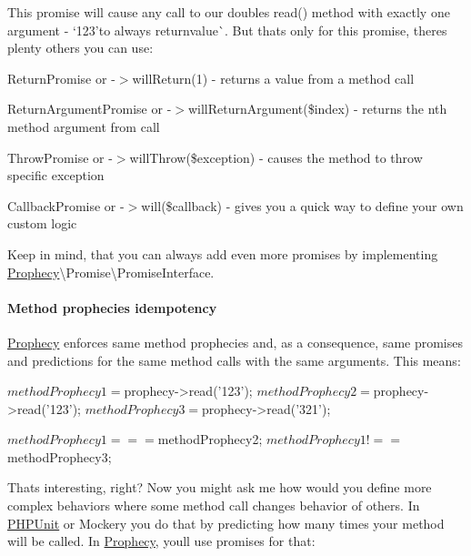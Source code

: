 This promise will cause any call to our double\textquotesingle{}s {\ttfamily read()} method with exactly one argument -\/ `\textquotesingle{}123'{\ttfamily to always return}\textquotesingle{}value\textquotesingle{}\`{}. But that\textquotesingle{}s only for this promise, there\textquotesingle{}s plenty others you can use\+:


\begin{DoxyItemize}
\item {\ttfamily Return\+Promise} or {\ttfamily -\/$>$will\+Return(1)} -\/ returns a value from a method call
\item {\ttfamily Return\+Argument\+Promise} or {\ttfamily -\/$>$will\+Return\+Argument(\$index)} -\/ returns the nth method argument from call
\item {\ttfamily Throw\+Promise} or {\ttfamily -\/$>$will\+Throw(\$exception)} -\/ causes the method to throw specific exception
\item {\ttfamily Callback\+Promise} or {\ttfamily -\/$>$will(\$callback)} -\/ gives you a quick way to define your own custom logic
\end{DoxyItemize}

Keep in mind, that you can always add even more promises by implementing {\ttfamily \mbox{\hyperlink{namespace_prophecy}{Prophecy}}\textbackslash{}Promise\textbackslash{}Promise\+Interface}.

\paragraph*{Method prophecies idempotency}

\mbox{\hyperlink{namespace_prophecy}{Prophecy}} enforces same method prophecies and, as a consequence, same promises and predictions for the same method calls with the same arguments. This means\+:


\begin{DoxyCode}
$methodProphecy1 = $prophecy->read(\textcolor{stringliteral}{'123'});
$methodProphecy2 = $prophecy->read(\textcolor{stringliteral}{'123'});
$methodProphecy3 = $prophecy->read(\textcolor{stringliteral}{'321'});

$methodProphecy1 === $methodProphecy2;
$methodProphecy1 !== $methodProphecy3;
\end{DoxyCode}


That\textquotesingle{}s interesting, right? Now you might ask me how would you define more complex behaviors where some method call changes behavior of others. In \mbox{\hyperlink{namespace_p_h_p_unit}{P\+H\+P\+Unit}} or Mockery you do that by predicting how many times your method will be called. In \mbox{\hyperlink{namespace_prophecy}{Prophecy}}, you\textquotesingle{}ll use promises for that\+:


